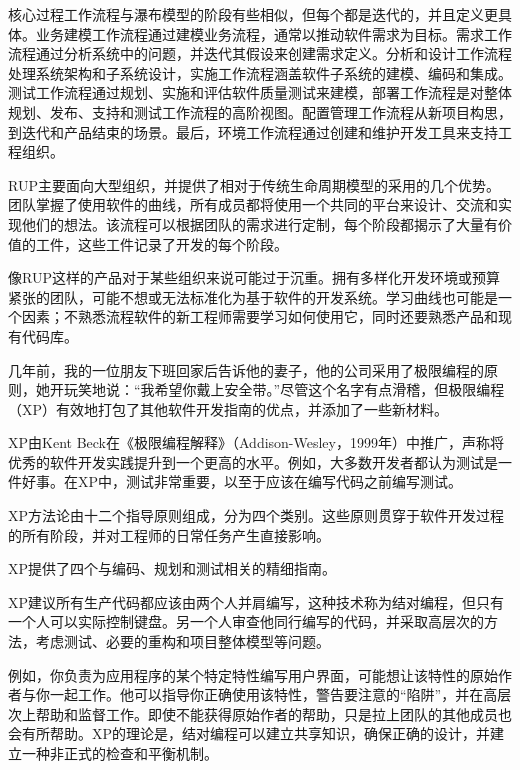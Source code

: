 核心过程工作流程与瀑布模型的阶段有些相似，但每个都是迭代的，并且定义更具体。业务建模工作流程通过建模业务流程，通常以推动软件需求为目标。需求工作流程通过分析系统中的问题，并迭代其假设来创建需求定义。分析和设计工作流程处理系统架构和子系统设计，实施工作流程涵盖软件子系统的建模、编码和集成。测试工作流程通过规划、实施和评估软件质量测试来建模，部署工作流程是对整体规划、发布、支持和测试工作流程的高阶视图。配置管理工作流程从新项目构思，到迭代和产品结束的场景。最后，环境工作流程通过创建和维护开发工具来支持工程组织。


RUP主要面向大型组织，并提供了相对于传统生命周期模型的采用的几个优势。团队掌握了使用软件的曲线，所有成员都将使用一个共同的平台来设计、交流和实现他们的想法。该流程可以根据团队的需求进行定制，每个阶段都揭示了大量有价值的工件，这些工件记录了开发的每个阶段。

像RUP这样的产品对于某些组织来说可能过于沉重。拥有多样化开发环境或预算紧张的团队，可能不想或无法标准化为基于软件的开发系统。学习曲线也可能是一个因素；不熟悉流程软件的新工程师需要学习如何使用它，同时还要熟悉产品和现有代码库。


几年前，我的一位朋友下班回家后告诉他的妻子，他的公司采用了极限编程的原则，她开玩笑地说：“我希望你戴上安全带。”尽管这个名字有点滑稽，但极限编程（XP）有效地打包了其他软件开发指南的优点，并添加了一些新材料。

XP由Kent Beck在《极限编程解释》（Addison-Wesley，1999年）中推广，声称将优秀的软件开发实践提升到一个更高的水平。例如，大多数开发者都认为测试是一件好事。在XP中，测试非常重要，以至于应该在编写代码之前编写测试。


XP方法论由十二个指导原则组成，分为四个类别。这些原则贯穿于软件开发过程的所有阶段，并对工程师的日常任务产生直接影响。


XP提供了四个与编码、规划和测试相关的精细指南。


XP建议所有生产代码都应该由两个人并肩编写，这种技术称为结对编程，但只有一个人可以实际控制键盘。另一个人审查他同行编写的代码，并采取高层次的方法，考虑测试、必要的重构和项目整体模型等问题。

例如，你负责为应用程序的某个特定特性编写用户界面，可能想让该特性的原始作者与你一起工作。他可以指导你正确使用该特性，警告要注意的“陷阱”，并在高层次上帮助和监督工作。即使不能获得原始作者的帮助，只是拉上团队的其他成员也会有所帮助。XP的理论是，结对编程可以建立共享知识，确保正确的设计，并建立一种非正式的检查和平衡机制。

